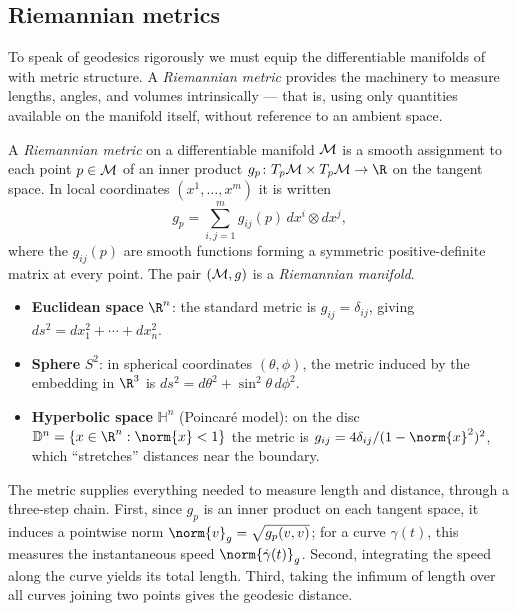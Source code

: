 \subsection{Riemannian metrics}
\label{subsec:geo:metrics}

To speak of geodesics rigorously we must equip the differentiable manifolds of
 with metric structure. A \emph{Riemannian metric}
provides the machinery to measure lengths, angles, and volumes intrinsically ---
that is, using only quantities available on the manifold itself, without
reference to an ambient space.

\begin{definition}
\label{def:geo:metric}
A \emph{Riemannian metric} on a differentiable manifold $\mathcal{M}$ is a smooth
assignment to each point $p \in \mathcal{M}$ of an inner product
$g_p \colon \TpM \times \TpM \to \R$ on the tangent space. In local coordinates
$(x^1, \dots, x^m)$ it is written
\[
  g_p = \sum_{i,j=1}^m g_{ij}(p)\, dx^i \otimes dx^j ,
\]
where the $g_{ij}(p)$ are smooth functions forming a symmetric positive-definite
matrix at every point. The pair $(\mathcal{M}, g)$ is a \emph{Riemannian manifold}.
\end{definition}

\begin{example}
\label{ex:geo:metrics}
\leavevmode
\begin{itemize}
  \item \textbf{Euclidean space} $\R^n$: the standard metric is $g_{ij} =
    \delta_{ij}$, giving $ds^2 = dx_1^2 + \cdots + dx_n^2$.
  \item \textbf{Sphere} $S^2$: in spherical coordinates $(\theta, \phi)$, the
    metric induced by the embedding in $\R^3$ is
    $ds^2 = d\theta^2 + \sin^2\theta\, d\phi^2$.
  \item \textbf{Hyperbolic space} $\mathbb{H}^n$ (Poincar\'e model): on the disc
    $\mathbb{D}^n = \{x \in \R^n : \norm{x} < 1\}$ the metric is
    $g_{ij} = 4\delta_{ij} / (1 - \norm{x}^2)^2$, which ``stretches'' distances
    near the boundary.
\end{itemize}
\end{example}

The metric supplies everything needed to measure length and distance, through a
three-step chain. First, since $g_p$ is an inner product on each tangent space,
it induces a pointwise norm $\norm{v}_g = \sqrt{g_p(v,v)}$; for a curve
$\gamma(t)$, this measures the instantaneous speed $\norm{\dot\gamma(t)}_g$.
Second, integrating the speed along the curve yields its total length. Third,
taking the infimum of length over all curves joining two points gives the
geodesic distance.

